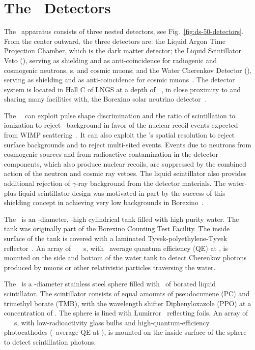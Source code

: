 \section{The \dsf\ Detectors}
\label{sec:detector}

The \dsf\ apparatus consists of three nested detectors, see Fig.~\ref{fig:ds-50-detectors}.  From the center outward, the three detectors are: the Liquid Argon Time Projection Chamber, which is the dark matter detector; the Liquid Scintillator Veto (\lsv), serving as shielding and as anti-coincidence for radiogenic and cosmogenic neutrons, {\gr s}, and cosmic muons; and the Water Cherenkov Detector (\wcd), serving as shielding and as anti-coincidence for cosmic muons~\cite{ctf:results,ctf:scitech}.  The detector system is located in Hall C of LNGS at a depth of \lngsequivdepth\ \cite{lngs-depth}, in close proximity to and sharing many facilities with, the Borexino solar neutrino detector~\cite{bx:detector,bx:plants}.  

The \lar\ \tpc\ can exploit pulse shape discrimination and the ratio of scintillation to ionization to reject \bg\ background in favor of the nuclear recoil events expected from WIMP scattering~\cite{boulay,warp}.  It can also exploit the \tpc's spatial resolution to reject surface backgrounds and to reject multi-sited events.  Events due to neutrons from cosmogenic sources and from radioactive contamination in the detector components, which also produce nuclear recoils, are suppressed by the combined action of the neutron and cosmic ray vetoes.  The liquid scintillator also provides additional rejection of $\gamma$-ray background from the detector materials.  The water-plus-liquid scintillator design was motivated in part by the success of this shielding concept in achieving very low backgrounds in Borexino~\cite{bx:detector,bx:7be-precision,bx:phase-I}.

The \wcd\ is an \ctfdiameter-diameter, \ctfheight-high cylindrical tank filled with high purity water.  The tank was originally part of the Borexino Counting Test Facility.  The inside surface of the tank is covered with a laminated Tyvek-polyethylene-Tyvek reflector~\cite{daya-bay}.  An array of \ctfpmtnum\ \ctfpmt\ \ctfpmtsize~{\pmt s}, with \ctfpmtqe\ average quantum efficiency (QE) at \ctfpmtwave, is mounted on the side and bottom of the water tank to detect Cherenkov photons produced by muons or other relativistic particles traversing the water.

The \lsv\ is a \lsvdiameter-diameter stainless steel sphere filled with \lsvscintillatormass\ of borated liquid scintillator.  The scintillator consists of equal amounts of pseudocumene (PC) and trimethyl borate (TMB), with the wavelength shifter Diphenyloxazole (PPO) at a concentration of \lsvppoconcentration.  The sphere is lined with Lumirror~\cite{lumirror} reflecting foils.  An array of  \lsvpmtnum\ \lsvpmt\ \lsvpmtsize~{\pmt s}, with low-radioactivity glass bulbs and high-quantum-efficiency photocathodes (\lsvpmtqe\ average QE at \lsvpmtwave), is mounted on the inside surface of the sphere to detect scintillation photons.


